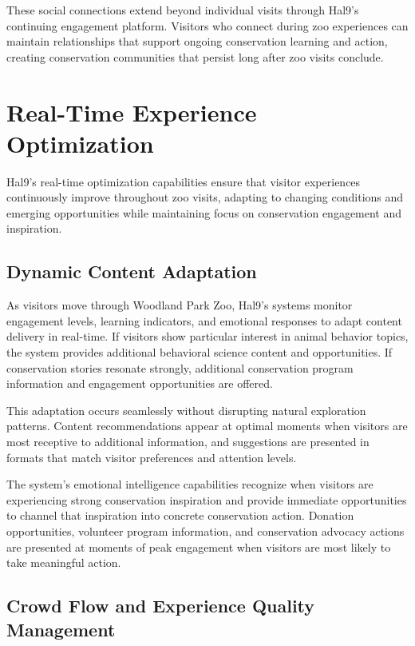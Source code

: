 \documentclass[
  Letterpaper,
]{scrbook}
\begin{document}
These social connections extend beyond individual visits through Hal9's
continuing engagement platform. Visitors who connect during zoo
experiences can maintain relationships that support ongoing conservation
learning and action, creating conservation communities that persist long
after zoo visits conclude.

\section{Real-Time Experience
Optimization}\label{real-time-experience-optimization}

Hal9's real-time optimization capabilities ensure that visitor
experiences continuously improve throughout zoo visits, adapting to
changing conditions and emerging opportunities while maintaining focus
on conservation engagement and inspiration.

\subsection{Dynamic Content
Adaptation}\label{dynamic-content-adaptation}

As visitors move through Woodland Park Zoo, Hal9's systems monitor
engagement levels, learning indicators, and emotional responses to adapt
content delivery in real-time. If visitors show particular interest in
animal behavior topics, the system provides additional behavioral
science content and opportunities. If conservation stories resonate
strongly, additional conservation program information and engagement
opportunities are offered.

This adaptation occurs seamlessly without disrupting natural exploration
patterns. Content recommendations appear at optimal moments when
visitors are most receptive to additional information, and suggestions
are presented in formats that match visitor preferences and attention
levels.

The system's emotional intelligence capabilities recognize when visitors
are experiencing strong conservation inspiration and provide immediate
opportunities to channel that inspiration into concrete conservation
action. Donation opportunities, volunteer program information, and
conservation advocacy actions are presented at moments of peak
engagement when visitors are most likely to take meaningful action.

\subsection{Crowd Flow and Experience Quality
Management}\label{crowd-flow-and-experience-quality-management}
\end{document}
